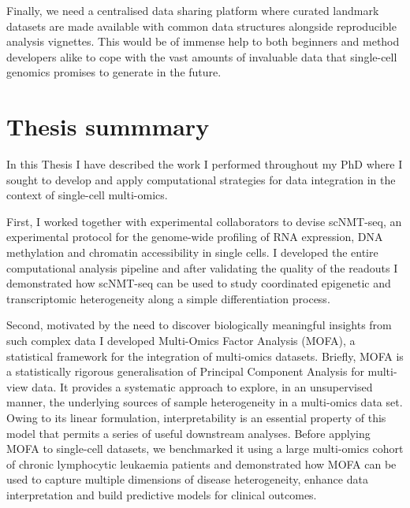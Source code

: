 Finally, we need a centralised data sharing platform where curated landmark datasets are made available with common data structures alongside reproducible analysis vignettes. This would be of immense help to both beginners and method developers alike to cope with the vast amounts of invaluable data that single-cell genomics promises to generate in the future.

\pagebreak

\section{Thesis summmary}

In this Thesis I have described the work I performed throughout my PhD where I sought to develop and apply computational strategies for data integration in the context of single-cell multi-omics.

First, I worked together with experimental collaborators to devise scNMT-seq, an experimental protocol for the genome-wide profiling of RNA expression, DNA methylation and chromatin accessibility in single cells. I developed the entire computational analysis pipeline and after validating the quality of the readouts I demonstrated how scNMT-seq can be used to study coordinated epigenetic and transcriptomic heterogeneity along a simple differentiation process.

Second, motivated by the need to discover biologically meaningful insights from such complex data I developed Multi-Omics Factor Analysis (MOFA), a statistical framework for the integration of multi-omics datasets. Briefly, MOFA is a statistically rigorous generalisation of Principal Component Analysis for multi-view data. It provides a systematic approach to explore, in an unsupervised manner, the underlying sources of sample heterogeneity in a multi-omics data set. Owing to its linear formulation, interpretability is an essential property of this model that permits a series of useful downstream analyses. Before applying MOFA to single-cell datasets, we benchmarked it using a large multi-omics cohort of chronic lymphocytic leukaemia patients and demonstrated how MOFA can be used to capture multiple dimensions of disease heterogeneity, enhance data interpretation and build predictive models for clinical outcomes.

